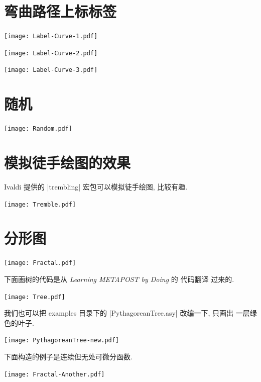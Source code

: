\documentclass[nofonts,CJKnormalspaces]{ctexbook}
\begin{document}
\section{弯曲路径上标标签}
\begin{center}\texttt{[image: Label-Curve-1.pdf]}\end{center}%

\begin{center}\texttt{[image: Label-Curve-2.pdf]}\end{center}%

\begin{center}\texttt{[image: Label-Curve-3.pdf]}\end{center}%


\section{随机}
\begin{center}\texttt{[image: Random.pdf]}\end{center}%


\section{模拟徒手绘图的效果}
Ivaldi 提供的 |trembling| 宏包可以模拟徒手绘图, 比较有趣.
\begin{center}\texttt{[image: Tremble.pdf]}\end{center}%

\section{分形图}
\begin{center}\texttt{[image: Fractal.pdf]}\end{center}%

下面画树的代码是从 \emph{Learning METAPOST by Doing} 的 \MP{} 代码翻译
过来的.

\begin{center}\texttt{[image: Tree.pdf]}\end{center}%


我们也可以把 examples 目录下的  |PythagoreanTree.asy| 改编一下, 只画出
一层绿色的叶子.
\begin{center}\texttt{[image: PythagoreanTree-new.pdf]}\end{center}%


下面构造的例子是连续但无处可微分函数.
\begin{center}\texttt{[image: Fractal-Another.pdf]}\end{center}%

\end{document}
